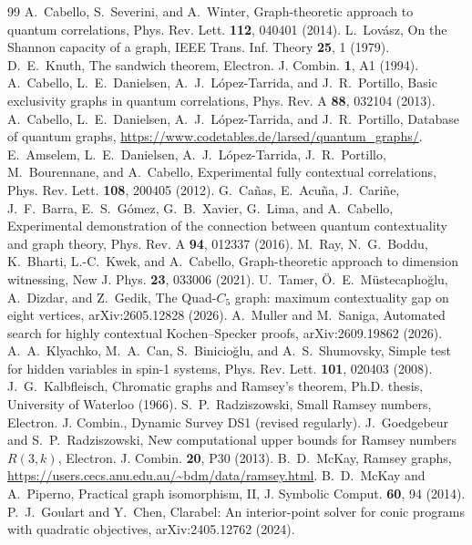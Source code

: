 \documentclass[11pt]{article}
\begin{document}
\begin{thebibliography}{99}
 A.~Cabello, S.~Severini, and A.~Winter, Graph-theoretic approach to quantum correlations, Phys. Rev. Lett. \textbf{112}, 040401 (2014).
 L.~Lov\'asz, On the Shannon capacity of a graph, IEEE Trans. Inf. Theory \textbf{25}, 1 (1979).
 D.~E.~Knuth, The sandwich theorem, Electron. J. Combin. \textbf{1}, A1 (1994).
 A.~Cabello, L.~E.~Danielsen, A.~J.~L\'opez-Tarrida, and J.~R.~Portillo, Basic exclusivity graphs in quantum correlations, Phys. Rev. A \textbf{88}, 032104 (2013).
 A.~Cabello, L.~E.~Danielsen, A.~J.~L\'opez-Tarrida, and J.~R.~Portillo, Database of quantum graphs, \url{https://www.codetables.de/larsed/quantum_graphs/}.
 E.~Amselem, L.~E.~Danielsen, A.~J.~L\'opez-Tarrida, J.~R.~Portillo, M.~Bourennane, and A.~Cabello, Experimental fully contextual correlations, Phys. Rev. Lett. \textbf{108}, 200405 (2012).
 G.~Ca\~nas, E.~Acu\~na, J.~Cari\~ne, J.~F.~Barra, E.~S.~G\'omez, G.~B.~Xavier, G.~Lima, and A.~Cabello, Experimental demonstration of the connection between quantum contextuality and graph theory, Phys. Rev. A \textbf{94}, 012337 (2016).
 M.~Ray, N.~G.~Boddu, K.~Bharti, L.-C.~Kwek, and A.~Cabello, Graph-theoretic approach to dimension witnessing, New J. Phys. \textbf{23}, 033006 (2021).
 U.~Tamer, \"O.~E.~M\"ustecapl{\i}o\u{g}lu, A.~Dizdar, and Z.~Gedik, The Quad-$C_5$ graph: maximum contextuality gap on eight vertices, arXiv:2605.12828 (2026).
 A.~Muller and M.~Saniga, Automated search for highly contextual Kochen--Specker proofs, arXiv:2609.19862 (2026).
 A.~A.~Klyachko, M.~A.~Can, S.~Binicio\u{g}lu, and A.~S.~Shumovsky, Simple test for hidden variables in spin-1 systems, Phys. Rev. Lett. \textbf{101}, 020403 (2008).
 J.~G.~Kalbfleisch, Chromatic graphs and Ramsey's theorem, Ph.D. thesis, University of Waterloo (1966).
 S.~P.~Radziszowski, Small Ramsey numbers, Electron. J. Combin., Dynamic Survey DS1 (revised regularly).
 J.~Goedgebeur and S.~P.~Radziszowski, New computational upper bounds for Ramsey numbers $R(3,k)$, Electron. J. Combin. \textbf{20}, P30 (2013).
 B.~D.~McKay, Ramsey graphs, \url{https://users.cecs.anu.edu.au/~bdm/data/ramsey.html}.
 B.~D.~McKay and A.~Piperno, Practical graph isomorphism, II, J. Symbolic Comput. \textbf{60}, 94 (2014).
 P.~J.~Goulart and Y.~Chen, Clarabel: An interior-point solver for conic programs with quadratic objectives, arXiv:2405.12762 (2024).

\end{thebibliography}
\end{document}
